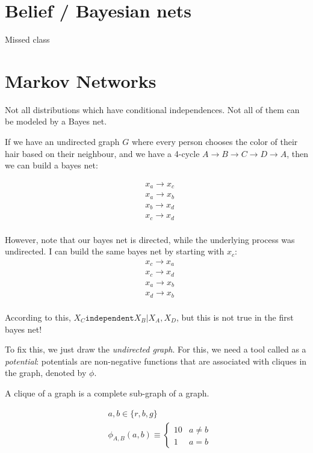 \documentclass[11pt]{book}
\begin{document}
\chapter{Belief / Bayesian nets}
Missed class
\chapter{Markov Networks}
Not all distributions which have conditional independences. Not all of
them can be modeled by a Bayes net.

If we have an undirected graph $G$ where every person chooses the color of
their hair based on their neighbour, and we have a 4-cycle $A \rightarrow B \rightarrow C \rightarrow D \rightarrow A$,
then we can build a bayes net:

\begin{align*}
&x_a \rightarrow x_c \\
&x_a \rightarrow x_b \\
&x_b \rightarrow x_d \\
&x_c \rightarrow x_d \\
\end{align*}

However, note that our bayes net is directed, while the underlying process
was undirected. I can build the same bayes net by starting with $x_c$:
\begin{align*}
&x_c \rightarrow x_a \\
&x_c \rightarrow x_d \\
&x_a \rightarrow x_b \\
&x_d \rightarrow x_b \\
\end{align*}

According to this, $X_C \texttt{independent} X_B | X_A, X_D$, but this is not
true in the first bayes net!

To fix this, we just draw the \emph{undirected graph}. For this, we need a tool 
called as a \emph{potential}: potentials are non-negative functions that are
associated with cliques in the graph, denoted by $\phi$.

A clique of a graph is a complete sub-graph of a graph.

\begin{align*}
&a, b \in \{ r, b, g \} \\
&\phi_{A, B}(a, b) \equiv \begin{cases} 10 & a \neq b \\ 1 & a = b\end{cases}
\end{align*}
\end{document}
